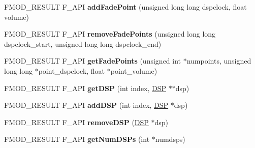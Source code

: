 \begin{DoxyCompactItemize}
\item 
\hypertarget{class_f_m_o_d_1_1_channel_control_afad4c1f77a3087562ed0891701fbefab}{F\+M\+O\+D\+\_\+\+R\+E\+S\+U\+L\+T F\+\_\+\+A\+P\+I {\bfseries add\+Fade\+Point} (unsigned long long dspclock, float volume)}\label{class_f_m_o_d_1_1_channel_control_afad4c1f77a3087562ed0891701fbefab}

\item 
\hypertarget{class_f_m_o_d_1_1_channel_control_aaaadd3054bd1f696c1b9fd177c82995f}{F\+M\+O\+D\+\_\+\+R\+E\+S\+U\+L\+T F\+\_\+\+A\+P\+I {\bfseries remove\+Fade\+Points} (unsigned long long dspclock\+\_\+start, unsigned long long dspclock\+\_\+end)}\label{class_f_m_o_d_1_1_channel_control_aaaadd3054bd1f696c1b9fd177c82995f}

\item 
\hypertarget{class_f_m_o_d_1_1_channel_control_a2a340b1e78140e6dd21bcb708587b386}{F\+M\+O\+D\+\_\+\+R\+E\+S\+U\+L\+T F\+\_\+\+A\+P\+I {\bfseries get\+Fade\+Points} (unsigned int $\ast$numpoints, unsigned long long $\ast$point\+\_\+dspclock, float $\ast$point\+\_\+volume)}\label{class_f_m_o_d_1_1_channel_control_a2a340b1e78140e6dd21bcb708587b386}

\item 
\hypertarget{class_f_m_o_d_1_1_channel_control_a7f212be1dd1d1dc37540a853dd5e74d4}{F\+M\+O\+D\+\_\+\+R\+E\+S\+U\+L\+T F\+\_\+\+A\+P\+I {\bfseries get\+D\+S\+P} (int index, \hyperlink{class_f_m_o_d_1_1_d_s_p}{D\+S\+P} $\ast$$\ast$dsp)}\label{class_f_m_o_d_1_1_channel_control_a7f212be1dd1d1dc37540a853dd5e74d4}

\item 
\hypertarget{class_f_m_o_d_1_1_channel_control_ac7f2186367a2dfb5d954681336bba096}{F\+M\+O\+D\+\_\+\+R\+E\+S\+U\+L\+T F\+\_\+\+A\+P\+I {\bfseries add\+D\+S\+P} (int index, \hyperlink{class_f_m_o_d_1_1_d_s_p}{D\+S\+P} $\ast$dsp)}\label{class_f_m_o_d_1_1_channel_control_ac7f2186367a2dfb5d954681336bba096}

\item 
\hypertarget{class_f_m_o_d_1_1_channel_control_afaad0596454ed0627e98b4fce72bd593}{F\+M\+O\+D\+\_\+\+R\+E\+S\+U\+L\+T F\+\_\+\+A\+P\+I {\bfseries remove\+D\+S\+P} (\hyperlink{class_f_m_o_d_1_1_d_s_p}{D\+S\+P} $\ast$dsp)}\label{class_f_m_o_d_1_1_channel_control_afaad0596454ed0627e98b4fce72bd593}

\item 
\hypertarget{class_f_m_o_d_1_1_channel_control_a8d818abc62a8839dae3d6dd782b23202}{F\+M\+O\+D\+\_\+\+R\+E\+S\+U\+L\+T F\+\_\+\+A\+P\+I {\bfseries get\+Num\+D\+S\+Ps} (int $\ast$numdsps)}\label{class_f_m_o_d_1_1_channel_control_a8d818abc62a8839dae3d6dd782b23202}


\end{DoxyCompactItemize}
